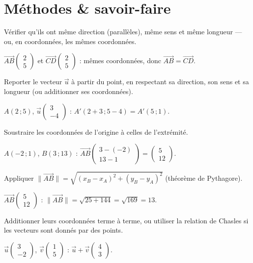\section{Méthodes \& savoir-faire}

Vérifier qu'ils ont même direction (parallèles), même sens et même longueur — ou, en
coordonnées, les mêmes coordonnées.
\begin{exemple}
$\vec{AB}\begin{pmatrix}2\\5\end{pmatrix}$ et $\vec{CD}\begin{pmatrix}2\\5\end{pmatrix}$ :
mêmes coordonnées, donc $\vec{AB}=\vec{CD}$.
\end{exemple}

Reporter le vecteur $\vec u$ à partir du point, en respectant sa direction, son sens et sa
longueur (ou additionner ses coordonnées).
\begin{exemple}
$A(2\,;5)$, $\vec u\begin{pmatrix}3\\-4\end{pmatrix}$ : $A'(2+3\,;5-4)=A'(5\,;1)$.
\end{exemple}

Soustraire les coordonnées de l'origine à celles de l'extrémité.
\begin{exemple}
$A(-2\,;1)$, $B(3\,;13)$ : $\vec{AB}\begin{pmatrix}3-(-2)\\13-1\end{pmatrix}=\begin{pmatrix}5\\12\end{pmatrix}$.
\end{exemple}

Appliquer $\|\vec{AB}\|=\sqrt{(x_B-x_A)^{2}+(y_B-y_A)^{2}}$ (théorème de Pythagore).
\begin{exemple}
$\vec{AB}\begin{pmatrix}5\\12\end{pmatrix}$ : $\|\vec{AB}\|=\sqrt{25+144}=\sqrt{169}=13$.
\end{exemple}

Additionner leurs coordonnées terme à terme, ou utiliser la relation de Chasles si les
vecteurs sont donnés par des points.
\begin{exemple}
$\vec u\begin{pmatrix}3\\-2\end{pmatrix}$, $\vec v\begin{pmatrix}1\\5\end{pmatrix}$ :
$\vec u+\vec v\begin{pmatrix}4\\3\end{pmatrix}$.
\end{exemple}


